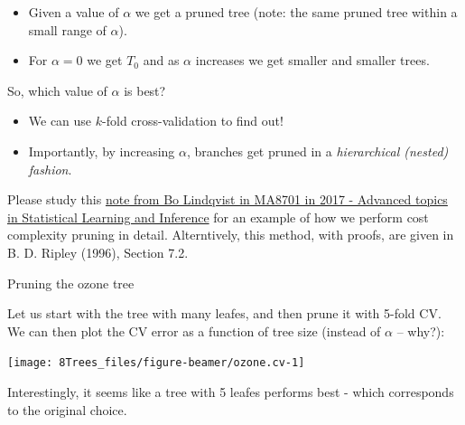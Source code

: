 \documentclass[10pt,ignorenonframetext,]{beamer}
\begin{document}
\begin{frame}

\begin{itemize}
\item
  Given a value of \(\alpha\) we get a pruned tree (note: the same
  pruned tree within a small range of \(\alpha\)).
\item
  For \(\alpha=0\) we get \(T_0\) and as \(\alpha\) increases we get
  smaller and smaller trees.
\end{itemize}

So, which value of \(\alpha\) is best?

\begin{itemize}
\item
  We can use \(k\)-fold cross-validation to find out!
\item
  Importantly, by increasing \(\alpha\), branches get pruned in a
  \emph{hierarchical (nested) fashion}.
\end{itemize}

Please study this
\href{https://www.math.ntnu.no/emner/TMA4268/2018v/notes/CART1MA87012017BoLindqvist.pdf}{note
from Bo Lindqvist in MA8701 in 2017 - Advanced topics in Statistical
Learning and Inference} for an example of how we perform cost complexity
pruning in detail. Alterntively, this method, with proofs, are given in
B. D. Ripley (1996), Section 7.2.

\end{frame}

\begin{frame}

\begin{block}{Pruning the ozone tree}

Let us start with the tree with many leafes, and then prune it with
5-fold CV. We can then plot the CV error as a function of tree size
(instead of \(\alpha\) -- why?):

\begin{center}\texttt{[image: 8Trees\_files/figure-beamer/ozone.cv-1]} \end{center}

Interestingly, it seems like a tree with 5 leafes performs best - which
corresponds to the original choice.

\end{block}

\end{frame}
\end{document}
